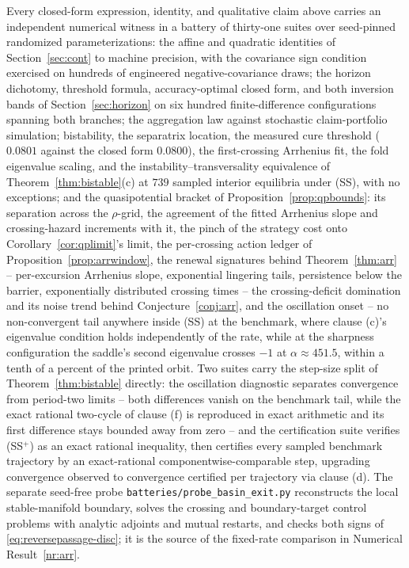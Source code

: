 \documentclass[11pt]{article}
\theoremstyle{definition}
\theoremstyle{remark}
\numberwithin{equation}{section}
\begin{document}
Every closed-form expression, identity, and qualitative claim above carries an independent numerical witness in a battery of thirty-one suites over seed-pinned randomized parameterizations: the affine and quadratic identities of Section~\ref{sec:cont} to machine precision, with the covariance sign condition exercised on hundreds of engineered negative-covariance draws; the horizon dichotomy, threshold formula, accuracy-optimal closed form, and both inversion bands of Section~\ref{sec:horizon} on six hundred finite-difference configurations spanning both branches; the aggregation law against stochastic claim-portfolio simulation; bistability, the separatrix location, the measured cure threshold ($0.0801$ against the closed form $0.0800$), the first-crossing Arrhenius fit, the fold eigenvalue scaling, and the instability--transversality equivalence of Theorem~\ref{thm:bistable}(c) at $739$ sampled interior equilibria under (SS), with no exceptions; and the quasipotential bracket of Proposition~\ref{prop:qpbounds}: its separation across the $\rho$-grid, the agreement of the fitted Arrhenius slope and crossing-hazard increments with it, the pinch of the strategy cost onto Corollary~\ref{cor:qplimit}'s limit, the per-crossing action ledger of Proposition~\ref{prop:arrwindow}, the renewal signatures behind Theorem~\ref{thm:arr} -- per-excursion Arrhenius slope, exponential lingering tails, persistence below the barrier, exponentially distributed crossing times -- the crossing-deficit domination and its noise trend behind Conjecture~\ref{conj:arr}, and the oscillation onset -- no non-convergent tail anywhere inside (SS) at the benchmark, where clause (c)'s eigenvalue condition holds independently of the rate, while at the sharpness configuration the saddle's second eigenvalue crosses $-1$ at $\alpha \approx 451.5$, within a tenth of a percent of the printed orbit. Two suites carry the step-size split of Theorem~\ref{thm:bistable} directly: the oscillation diagnostic separates convergence from period-two limits -- both differences vanish on the benchmark tail, while the exact rational two-cycle of clause (f) is reproduced in exact arithmetic and its first difference stays bounded away from zero -- and the certification suite verifies (SS$^+$) as an exact rational inequality, then certifies every sampled benchmark trajectory by an exact-rational componentwise-comparable step, upgrading convergence observed to convergence certified per trajectory via clause (d). The separate seed-free probe \texttt{batteries/probe\_basin\_exit.py} reconstructs the local stable-manifold boundary, solves the crossing and boundary-target control problems with analytic adjoints and mutual restarts, and checks both signs of \eqref{eq:reversepassage-disc}; it is the source of the fixed-rate comparison in Numerical Result~\ref{nr:arr}.
\end{document}
